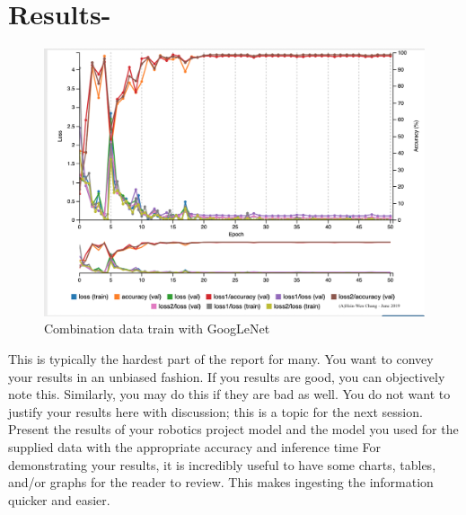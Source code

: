 \documentclass[10pt,journal,compsoc]{IEEEtran}
\begin{document}
\section{Results-}
\begin{figure}[thpb]
      \centering
      \includegraphics[width=\linewidth]{GoogLeNET.png}
      \caption{Combination data train with GoogLeNet}
      \label{fig:robot1}
\end{figure}

This is typically the hardest part of the report for many. You want to convey your results in an unbiased fashion. If you results are good, you can objectively note this. Similarly, you may do this if they are bad as well. You do not want to justify your results here with discussion; this is a topic for the next session. 
Present the results of your robotics project model and the model you used for the supplied data with the appropriate accuracy and inference time
For demonstrating your results, it is incredibly useful to have some charts, tables, and/or graphs for the reader to review. This makes ingesting the information quicker and easier.
\end{document}
